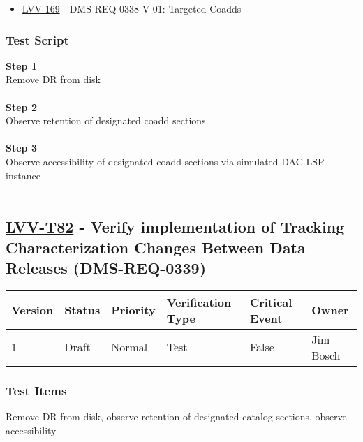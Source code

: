 \begin{itemize}
\tightlist
\item
  \href{https://jira.lsstcorp.org/browse/LVV-169}{LVV-169} -
  DMS-REQ-0338-V-01: Targeted Coadds
\end{itemize}

\hypertarget{test-script-58}{%
\subsubsection{Test Script}\label{test-script-58}}

\textbf{Step 1}\\
Remove DR from disk\\
~\\
\textbf{Step 2}\\
Observe retention of designated coadd sections\\
~\\
\textbf{Step 3}\\
Observe accessibility of designated coadd sections via simulated DAC LSP
instance\\
~\\

\hypertarget{lvv-t82---verify-implementation-of-tracking-characterization-changes-between-data-releases-dms-req-0339}{%
\subsection{\texorpdfstring{\href{https://jira.lsstcorp.org/secure/Tests.jspa\#/testCase/LVV-T82}{LVV-T82}
- Verify implementation of Tracking Characterization Changes Between
Data Releases
(DMS-REQ-0339)}{LVV-T82 - Verify implementation of Tracking Characterization Changes Between Data Releases (DMS-REQ-0339)}}\label{lvv-t82---verify-implementation-of-tracking-characterization-changes-between-data-releases-dms-req-0339}}

\begin{longtable}[]{@{}llllll@{}}
\toprule
Version & Status & Priority & Verification Type & Critical Event &
Owner\tabularnewline
\midrule
\endhead
1 & Draft & Normal & Test & False & Jim Bosch\tabularnewline
\bottomrule
\end{longtable}

\hypertarget{test-items-58}{%
\subsubsection{Test Items}\label{test-items-58}}

Remove DR from disk, observe retention of designated catalog sections,
observe accessibility

